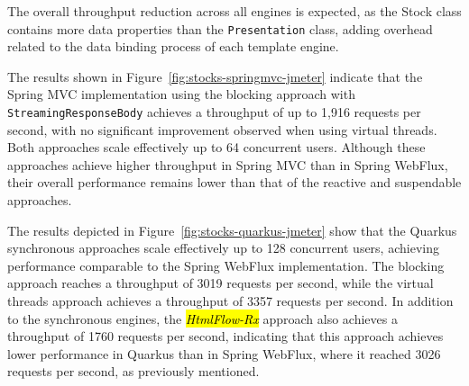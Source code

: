 \documentclass[software,article,accept,pdftex,moreauthors]{Definitions/mdpi}
\begin{document}
The overall throughput reduction across all engines is expected, as the Stock
class contains more data properties than the \texttt{Presentation} class,
adding overhead related to the data binding process of each template engine.



The results shown in Figure~\ref{fig:stocks-springmvc-jmeter} indicate that the
Spring MVC implementation using the blocking approach with
\texttt{StreamingResponseBody} achieves a throughput of up to 1,916 requests
per second, with no significant improvement observed when using virtual
threads. Both approaches scale effectively up to 64 concurrent users. Although
these approaches achieve higher throughput in Spring MVC than in Spring
WebFlux, their overall performance remains lower than that of the reactive and
suspendable approaches.

The results depicted in Figure~\ref{fig:stocks-quarkus-jmeter} show that the
Quarkus synchronous approaches scale effectively up to 128 concurrent users,
achieving performance comparable to the Spring WebFlux implementation. The
blocking approach reaches a throughput of 3019 requests per second, while the
virtual threads approach achieves a throughput of 3357 requests per second. In
addition to the synchronous engines, the \textit{\hl{HtmlFlow-Rx}} approach also
achieves a throughput of 1760 requests per second, indicating that this
approach achieves lower performance in Quarkus than in Spring WebFlux, where it
reached 3026 requests per second, as previously mentioned.
\end{document}
